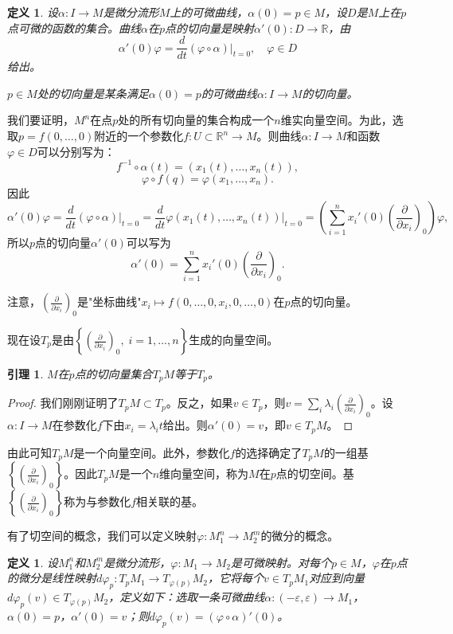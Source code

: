 \documentclass[12pt,a4paper]{ctexbook}
\newtheorem{lemma}[theorem]{引理}
\newtheorem{definition}[theorem]{定义}
\begin{document}
\begin{definition}
设$\alpha:I\to M$是微分流形$M$上的可微曲线，$\alpha(0)=p\in M$，设$D$是$M$上在$p$点可微的函数的集合。曲线$\alpha$在$p$点的切向量是映射$\alpha'(0):D\to\mathbb{R}$，由
$$\alpha'(0)\varphi = \frac{d}{dt}(\varphi\circ\alpha)\big|_{t=0},\quad \varphi\in D$$
给出。

$p\in M$处的切向量是某条满足$\alpha(0)=p$的可微曲线$\alpha:I\to M$的切向量。
\end{definition}

我们要证明，$M^n$在点$p$处的所有切向量的集合构成一个$n$维实向量空间。为此，选取$p=f(0,\ldots,0)$附近的一个参数化$f:U\subset\mathbb{R}^n\to M$。则曲线$\alpha:I\to M$和函数$\varphi\in D$可以分别写为：
$$f^{-1}\circ\alpha(t) = (x_1(t),\ldots,x_n(t)),$$
$$\varphi\circ f(q) = \varphi(x_1,\ldots,x_n).$$
因此
$$\alpha'(0)\varphi = \frac{d}{dt}(\varphi\circ\alpha)\big|_{t=0} = \frac{d}{dt}\varphi(x_1(t),\ldots,x_n(t))\big|_{t=0} = \left(\sum_{i=1}^n x_i'(0)\left(\frac{\partial}{\partial x_i}\right)_0\right)\varphi,$$
所以$p$点的切向量$\alpha'(0)$可以写为
$$\alpha'(0) = \sum_{i=1}^n x_i'(0)\left(\frac{\partial}{\partial x_i}\right)_0. \tag{1}$$

注意，$\left(\frac{\partial}{\partial x_i}\right)_0$是"坐标曲线"$x_i\mapsto f(0,\ldots,0,x_i,0,\ldots,0)$在$p$点的切向量。

现在设$T_p$是由$\left\{\left(\frac{\partial}{\partial x_i}\right)_0,\; i=1,\ldots,n\right\}$生成的向量空间。

\begin{lemma}
$M$在$p$点的切向量集合$T_pM$等于$T_p$。
\end{lemma}

\begin{proof}
我们刚刚证明了$T_pM\subset T_p$。反之，如果$v\in T_p$，则$v = \sum_i \lambda_i \left(\frac{\partial}{\partial x_i}\right)_0$。设$\alpha:I\to M$在参数化$f$下由$x_i = \lambda_i t$给出。则$\alpha'(0)=v$，即$v\in T_pM$。
\end{proof}

由此可知$T_pM$是一个向量空间。此外，参数化$f$的选择确定了$T_pM$的一组基$\left\{\left(\frac{\partial}{\partial x_i}\right)_0\right\}$。因此$T_pM$是一个$n$维向量空间，称为$M$在$p$点的切空间。基$\left\{\left(\frac{\partial}{\partial x_i}\right)_0\right\}$称为与参数化$f$相关联的基。

有了切空间的概念，我们可以定义映射$\varphi:M_1^n\to M_2^m$的微分的概念。

\begin{definition}
设$M_1^n$和$M_2^m$是微分流形，$\varphi:M_1\to M_2$是可微映射。对每个$p\in M$，$\varphi$在$p$点的微分是线性映射$d\varphi_p:T_pM_1\to T_{\varphi(p)}M_2$，它将每个$v\in T_pM_1$对应到向量$d\varphi_p(v)\in T_{\varphi(p)}M_2$，定义如下：选取一条可微曲线$\alpha:(-\varepsilon,\varepsilon)\to M_1$，$\alpha(0)=p$，$\alpha'(0)=v$；则$d\varphi_p(v) = (\varphi\circ\alpha)'(0)$。
\end{definition}
\end{document}
